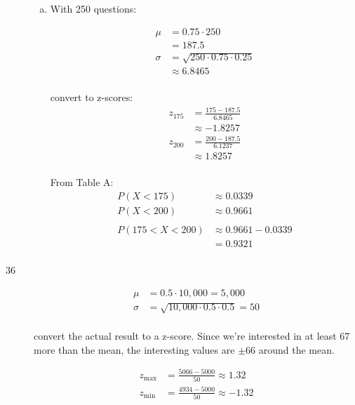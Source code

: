 \documentclass[letterpaper, landscape]{exam}
\begin{document}
\begin{description}
\begin{enumerate}[(a)]
          \item
            With 250 questions:

            \begin{align*}
              \mu    & = 0.75 \cdot 250 \\
                     & = 187.5 \\
              \sigma & = \sqrt{250 \cdot 0.75 \cdot 0.25} \\
                     & \approx 6.8465 \\
            \end{align*}

            convert to z-scores:
            \begin{align*}
              z_{175} & = \frac{175 - 187.5}{6.8465} \\
                      & \approx -1.8257 \\
              z_{200} & = \frac{200 - 187.5}{6.1237} \\
                      & \approx 1.8257 \\
            \end{align*}

            From Table A\@:
            \begin{align*}
              P(X < 175) & \approx 0.0339 \\
              P(X < 200) & \approx 0.9661 \\
              \\
              P(175 < X < 200) & \approx 0.9661 - 0.0339 \\
                               & = \boxed{ 0.9321 } \\
            \end{align*}
        
        \end{enumerate}

      \item[36]
        \begin{align*}
          \mu    & = 0.5 \cdot 10,000 = 5,000 \\
          \sigma & = \sqrt{10,000 \cdot 0.5 \cdot 0.5} = 50 \\
        \end{align*}

        convert the actual result to a z-score. Since we're interested in at
        least 67 more than the mean, the interesting values are $\pm 66$ around
        the mean.

        \begin{align*}
          z_{\max} &= \frac{5066 - 5000}{50} \approx 1.32 \\
          z_{\min} &= \frac{4934 - 5000}{50} \approx -1.32 \\
        \end{align*}


\end{description}
\end{document}
